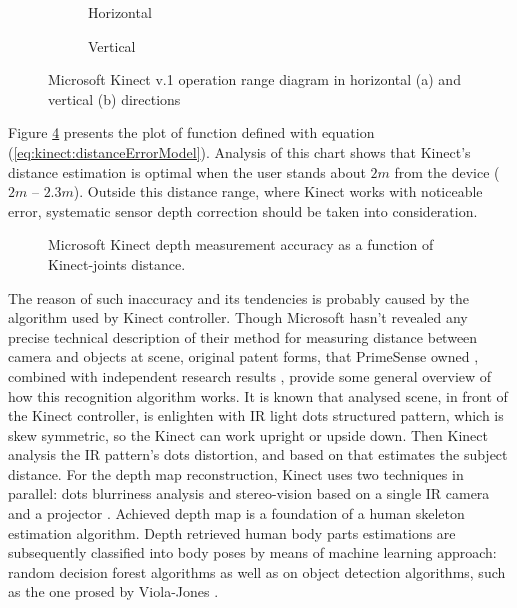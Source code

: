 \documentclass[sensors,article,submit,moreauthors,pdftex,10pt,a4paper]{mdpi}
\begin{document}
\begin{figure}[H]
	\centering
	\begin{subfigure}[b]{0.4\textwidth}
		\centering
		
		\caption{Horizontal}
		\label{fig:kinect:range:a}
	\end{subfigure} \hfill
	\begin{subfigure}[b]{0.4\textwidth}
		\centering
		
		\caption{Vertical}
		\label{fig:kinect:range:b}
	\end{subfigure} \hfill
	\begin{subfigure}[p]{0.18\textwidth}
		\hfill
		               
	\end{subfigure}
	\caption{Microsoft Kinect v.1 operation range diagram in horizontal (a) and vertical (b) directions}
	\label{fig:kinect:range}
\end{figure}   

Figure \ref{fig:kinect:distanceAccuracy} presents the plot of function defined with equation (\ref{eq:kinect:distanceErrorModel}). Analysis of this chart shows that Kinect’s distance estimation is optimal when the user stands about $2m$ from the device ($2m$ – $2.3m$). Outside this distance range, where Kinect works with noticeable error, systematic sensor depth correction should be taken into consideration.

\begin{figure}[H]
	\centering	
											
	\caption{Microsoft Kinect depth measurement accuracy as a function of Kinect-joints distance.}
	\label{fig:kinect:distanceAccuracy}
\end{figure}

The reason of such inaccuracy and its tendencies is probably caused by the algorithm used by Kinect controller. Though Microsoft hasn’t revealed any precise technical description of their method for measuring distance between camera and objects at scene, original patent forms, that PrimeSense owned \cite{patent:20100118123,patent:20100020078,patent:20080106746}, combined with independent research results \cite{reichinger2011}, provide some general overview of how this recognition algorithm works. It is known that analysed scene, in front of the Kinect controller, is enlighten with IR light dots structured pattern, which is skew symmetric, so the Kinect can work upright or upside down. Then Kinect analysis the IR pattern’s dots distortion, and based on that estimates the subject distance. For the depth map reconstruction, Kinect uses two techniques in parallel: dots blurriness analysis \cite{Fofi2004} and stereo-vision based on a single IR camera and a projector \cite{Rzeszotarski2006}. Achieved depth map is a foundation of a human skeleton estimation algorithm. Depth retrieved human body parts estimations are subsequently classified into body poses by means of machine learning approach: random decision forest algorithms as well as on object detection algorithms, such as the one prosed by Viola-Jones \cite{Shotton2008, Shotton2011a}. 
\end{document}
